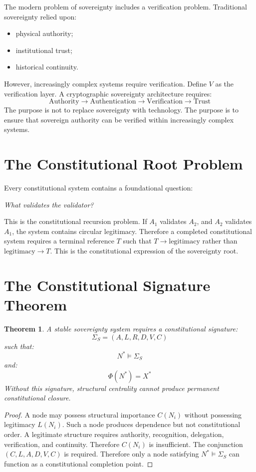 \documentclass[11pt,openany]{book}
\theoremstyle{plain}
\newtheorem{theorem}{Theorem}[chapter]
\theoremstyle{definition}
\begin{document}
The modern problem of sovereignty includes a verification problem. Traditional sovereignty relied upon:
\begin{itemize}
\item physical authority;
\item institutional trust;
\item historical continuity.
\end{itemize}
However, increasingly complex systems require verification. Define \(V\) as the verification layer. A cryptographic sovereignty architecture requires:
\[
\text{Authority} \longrightarrow \text{Authentication} \longrightarrow \text{Verification} \longrightarrow \text{Trust}
\]
The purpose is not to replace sovereignty with technology. The purpose is to ensure that sovereign authority can be verified within increasingly complex systems.

\section{The Constitutional Root Problem}

Every constitutional system contains a foundational question:
\begin{center}
\textit{
What validates the validator?
}
\end{center}
This is the constitutional recursion problem. If \(A_1\) validates \(A_2\), and \(A_2\) validates \(A_1\), the system contains circular legitimacy. Therefore a completed constitutional system requires a terminal reference \(T\) such that \(T \to \text{legitimacy}\) rather than \(\text{legitimacy} \to T\). This is the constitutional expression of the sovereignty root.

\section{The Constitutional Signature Theorem}

\begin{theorem}
A stable sovereignty system requires a constitutional signature:
\[
\Sigma_S = (A, L, R, D, V, C)
\]
such that:
\[
N^* \models \Sigma_S
\]
and:
\[
\Phi(N^*) = X^*
\]
Without this signature, structural centrality cannot produce permanent constitutional closure.
\end{theorem}

\begin{proof}
A node may possess structural importance \(C(N_i)\) without possessing legitimacy \(L(N_i)\). Such a node produces dependence but not constitutional order. A legitimate structure requires authority, recognition, delegation, verification, and continuity. Therefore \(C(N_i)\) is insufficient. The conjunction \((C, L, A, D, V, C)\) is required. Therefore only a node satisfying \(N^* \models \Sigma_S\) can function as a constitutional completion point.
\end{proof}
\end{document}
